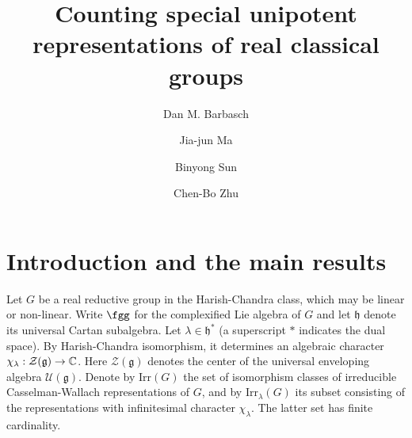 \documentclass[12pt,a4paper]{amsart}
\newcommand{\CZ}{{\mathcal {Z}}}
\newcommand{\g}{\mathfrak g}
\newcommand{\h}{\mathfrak h}
\numberwithin{equation}{section}
\theoremstyle{remark}
\def\Irr{\mathrm{Irr}}
\begin{document}
\title[]{Counting special unipotent representations of real classical groups}

\author [D. Barbasch] {Dan M. Barbasch}
\address{the Department of Mathematics\\
  310 Malott Hall, Cornell University, Ithaca, New York 14853 }

\author [J.-J. Ma] {Jia-jun Ma}
\address{School of Mathematical Sciences\\
  Shanghai Jiao Tong University\\
  800 Dongchuan Road, Shanghai, 200240, China} 

\author [B. Sun] {Binyong Sun}
\address{Academy of Mathematics and Systems Science\\
  Chinese Academy of Sciences\\
  Beijing, 100190, China} 

\author [C.-B. Zhu] {Chen-Bo Zhu}
\address{Department of Mathematics\\
  National University of Singapore\\
  10 Lower Kent Ridge Road, Singapore 119076} 




 

\maketitle


\tableofcontents

\section{Introduction and the main results}

Let $G$ be a real reductive group in the Harish-Chandra class, which may be linear or non-linear. Write $\fgg$ for the complexified Lie algebra of $G$ and let $\h$ denote its universal Cartan subalgebra. Let $\lambda \in \h^*$ (a superscript $*$ indicates the dual space). By Harish-Chandra isomorphism, it determines  an algebraic character $\chi_\lambda: \CZ(\g)\rightarrow \C$. Here $\CZ(\g)$ denotes the center of the universal enveloping algebra $\mathcal U(\g)$. Denote by $\Irr(G)$ the set of isomorphism classes of irreducible Casselman-Wallach representations of $G$, and by $\Irr_\lambda(G)$ its subset consisting of the representations with infinitesimal character $\chi_\lambda$. The latter set has finite cardinality. 
\end{document}
